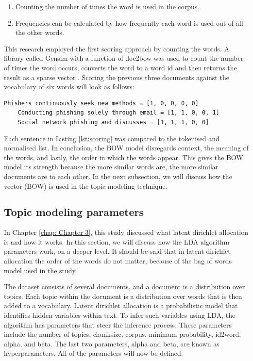 \begin{enumerate}
    \item Counting the number of times the word is used in the corpus.
    \item Frequencies can be calculated by how frequently each word is used out of all the other words.
\end{enumerate}

This research employed the first scoring approach by counting the words. A library called Gensim with a function of doc2bow was used to count the number of times the word occurs, converts the word to a word id and then returns the result as a sparse vector \cite{rehurek2010software}. Scoring the previous three documents against the vocabulary of six words will look as follows:

\begin{lstlisting}[language=Text, label={lst:scoring}, caption=Scoring the documents]
    Phishers continuously seek new methods = [1, 0, 0, 0, 0]
    Conducting phishing solely through email = [1, 1, 0, 0, 1]
    Social network phishing and discusses = [1, 1, 1, 0, 0]
\end{lstlisting}

Each sentence in Listing \ref{lst:scoring} was compared to the tokenised and normalised list. In conclusion, the BOW model disregards context, the meaning of the words, and lastly, the order in which the words appear. This gives the BOW model its strength because the more similar words are, the more similar documents are to each other. In the next subsection, we will discuss how the vector (BOW) is used in the topic modeling technique.

\subsection{Topic modeling parameters} \label{ssec:LDA}

In Chapter \ref{chap: Chapter 3}, this study discussed what latent dirichlet allocation is and how it works. In this section, we will discuss how the LDA algorithm parameters work, on a deeper level. It should be said that in latent dirichlet allocation the order of the words do not matter, because of the bag of words model used in the study.

The dataset consists of several documents, and a document is a distribution over topics. Each topic within the document is a distribution over words that is then added to a vocabulary. Latent dirichlet allocation is a probabilistic model that identifies hidden variables within text. To infer such variables using LDA, the algorithm has parameters that steer the inference process. These parameters include the number of topics, chunksize, corpus, minimum probability, id2word, alpha, and beta. The last two parameters, alpha and beta, are known as hyperparameters.  All of the parameters will now be defined:

